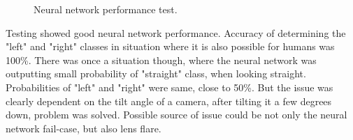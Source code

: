 \begin{figure}[!h]
  \begin{minipage}{.5\linewidth}
  \centering
  \end{minipage}
  \begin{minipage}{.5\linewidth}
  \centering	
  

  \end{minipage}
  
  
  \caption{Neural network performance test.}
  \label{fig:test_nn}
\end{figure}

Testing showed good neural network performance. Accuracy of determining the "left" and "right" classes in situation where it is also possible for humans was 100\%. There was once a situation though, where the neural network was outputting small probability of "straight" class, when looking straight. Probabilities of "left" and "right" were same, close to 50\%. But the issue was clearly dependent on the tilt angle of a camera, after tilting it a few degrees down, problem was solved. Possible source of issue could be not only the neural network fail-case, but also lens flare.

